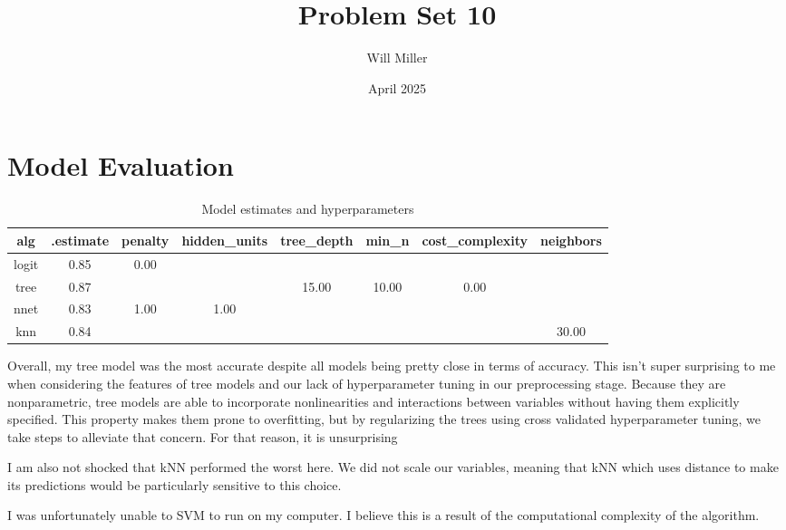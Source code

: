 \documentclass{article}
\title{Problem Set 10}
\author{Will Miller}
\date{April 2025}
\begin{document}
\maketitle

\section{Model Evaluation}



\begin{table}[ht]
\centering
\hspace*{-1.5cm}
\begin{tabular}{|c|c|c|c|c|c|c|c|}
\hline
\textbf{alg} & \textbf{.estimate} & \textbf{penalty} & \textbf{hidden\_units} & \textbf{tree\_depth} & \textbf{min\_n} & \textbf{cost\_complexity} & \textbf{neighbors} \\
\hline
logit & 0.85 & 0.00 & & & & & \\
tree  & 0.87 &      & & 15.00 & 10.00 & 0.00 & \\
nnet  & 0.83 & 1.00 & 1.00 & & & & \\
knn   & 0.84 &      & & & & & 30.00 \\
\hline
\end{tabular}
\caption{Model estimates and hyperparameters}
\label{tab:model_results_full}
\end{table}

Overall, my tree model was the most accurate despite all models being pretty close in terms of accuracy. This isn't super surprising to me when considering the features of tree models and our lack of hyperparameter tuning in our preprocessing stage. Because they are nonparametric, tree models are able to incorporate nonlinearities and interactions between variables without having them explicitly specified. This property makes them prone to overfitting, but by regularizing the trees using cross validated hyperparameter tuning, we take steps to alleviate that concern. For that reason, it is unsurprising 

I am also not shocked that kNN performed the worst here. We did not scale our variables, meaning that kNN \textemdash which uses distance to make its predictions \emdash would be particularly sensitive to this choice.

I was unfortunately unable to SVM to run on my computer. I believe this is a result of the computational complexity of the algorithm.
\end{document}
